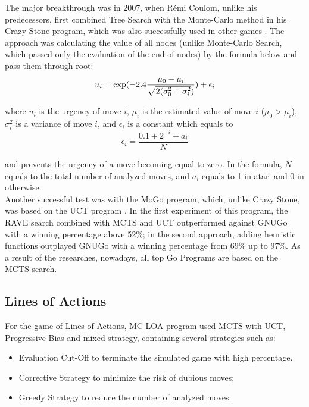 \documentclass[paper=8.27in:11.69in]{scrartcl}
\begin{document}
The major breakthrough was in 2007, when Rémi Coulom, unlike his predecessors, first combined Tree Search with the Monte-Carlo method in his Crazy Stone program, which was also successfully used in other games \cite{Coulom2006EfficientSA}. The approach was calculating the value of all nodes (unlike Monte-Carlo Search, which passed only the evaluation of the end of nodes) by the formula below and pass them through root:\\

\begin{equation}
\label{eq:Formula3}
u_{i} = \textup{exp}(-2.4\frac{{{\mu}_{0}} - {{\mu}_{i}}}{\sqrt{2(\sigma_{0}^{2} + \sigma_{i}^{2}})}) + \epsilon_{i}
\end{equation}

where $u_{i}$ is the urgency of move $i$, ${\mu}_{i}$ is the estimated value of move $i$ (${{\mu}_{0}} > {{\mu}_{i}}$), $\sigma_{i}^{2}$ is a variance of move $i$, and $\epsilon_{i}$ is a constant which equals to \\

\begin{equation}
\label{eq:Formula4}
\epsilon_{i} = \frac{0.1 + 2^{-i} + a_{i}}{N}
\end{equation}

and prevents the urgency of a move becoming equal to zero. In the formula, $N$ equals to the total number of analyzed moves, and $a_{i}$ equals to 1 in atari and 0 in otherwise.\\
Another successful test was with the MoGo program, which, unlike Crazy Stone, was based on the UCT program \cite{Gelly2011MonteCarloTS}. In the first experiment of this program, the RAVE search combined with MCTS and UCT outperformed against GNUGo with a winning percentage above 52\%; in the second approach, adding heuristic functions outplayed GNUGo with a winning percentage from 69\% up to 97\%. As a result of the researches, nowadays, all top Go Programs are based on the MCTS search.
\subsection{Lines of Actions}
For the game of Lines of Actions, MC-LOA program used MCTS with UCT, Progressive Bias and mixed strategy, containing several strategies such as:

\begin{itemize}
\item Evaluation Cut-Off to terminate the simulated game with high percentage.\\
\item Corrective Strategy to minimize the risk of dubious moves;\\
\item Greedy Strategy to reduce the number of analyzed moves.\\
\end{itemize}
\end{document}
